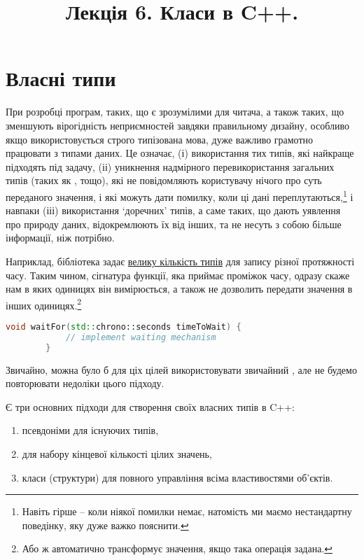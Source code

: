 \documentclass[12pt]{article}
\title{Лекція 6. Класи в C++.}
\begin{document}
	\maketitle

	\tableofcontents
	
	\section{Власні типи}
	При розробці програм, таких, що є зрозумілими для читача, а також таких, що зменшують вірогідність неприємностей завдяки правильному дизайну, особливо якщо використовується строго типізована мова, дуже важливо грамотно працювати з типами даних. Це означає, (і) використання тих типів, які найкраще підходять під задачу, (іі) уникнення надмірного перевикористання загальних типів (таких як ,  тощо), які не повідомляють користувачу нічого про суть переданого значення, і які можуть дати помилку, коли ці дані переплутаються,\footnote{Навіть гірше -- коли ніякої помилки немає, натомість ми маємо нестандартну поведінку, яку дуже важко пояснити.} і навпаки (ііі) використання `доречних' типів, а саме таких, що дають уявлення про природу даних, відокремлюють їх від інших, та не несуть з собою більше інформації, ніж потрібно.

	Наприклад, бібліотека  задає \href{https://en.cppreference.com/w/cpp/chrono/duration}{велику кількість типів} для запису різної протяжності часу. Таким чином, сігнатура функції, яка приймає проміжок часу, одразу скаже нам в яких одиницях він вимірюється, а також не дозволить передати значення в інших одиницях.\footnote{Або ж автоматично трансформує значення, якщо така операція задана.}

	\begin{lstlisting}[language=c++]
		void waitFor(std::chrono::seconds timeToWait) {
			// implement waiting mechanism
		}
	\end{lstlisting}

	Звичайно, можна було б для ціх цілей використовувати звичайний , але не будемо повторювати недоліки цього підходу.

	Є три основних підходи для створення своїх власних типів в C++:
	\begin{enumerate}
		\item псевдоніми для існуючих типів,
		\item {} для набору кінцевої кількості цілих значень,
		\item класи (структури) для повного управління всіма властивостями об'єктів.
	\end{enumerate}
\end{document}
